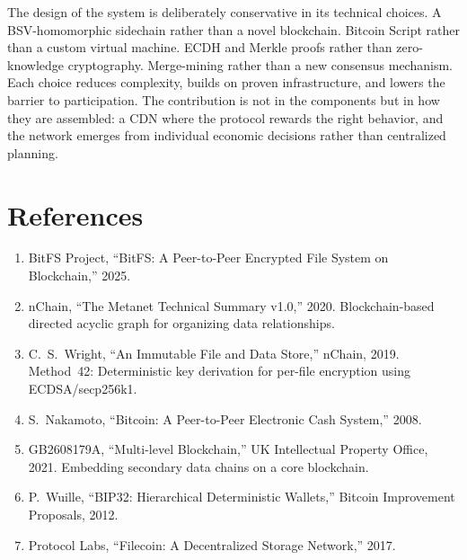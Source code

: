 \documentclass[11pt,a4paper]{article}
\begin{document}
The design of the system is deliberately conservative in its technical choices. A BSV-homomorphic sidechain rather than a novel blockchain. Bitcoin Script rather than a custom virtual machine. ECDH and Merkle proofs rather than zero-knowledge cryptography. Merge-mining rather than a new consensus mechanism. Each choice reduces complexity, builds on proven infrastructure, and lowers the barrier to participation. The contribution is not in the components but in how they are assembled: a CDN where the protocol rewards the right behavior, and the network emerges from individual economic decisions rather than centralized planning.

\section*{References}

\begin{enumerate}
\item BitFS Project, ``BitFS: A Peer-to-Peer Encrypted File System on Blockchain,'' 2025.

\item nChain, ``The Metanet Technical Summary v1.0,'' 2020. Blockchain-based directed acyclic graph for organizing data relationships.

\item C.~S.~Wright, ``An Immutable File and Data Store,'' nChain, 2019. Method~42: Deterministic key derivation for per-file encryption using ECDSA/secp256k1.

\item S.~Nakamoto, ``Bitcoin: A Peer-to-Peer Electronic Cash System,'' 2008.

\item GB2608179A, ``Multi-level Blockchain,'' UK Intellectual Property Office, 2021. Embedding secondary data chains on a core blockchain.

\item P.~Wuille, ``BIP32: Hierarchical Deterministic Wallets,'' Bitcoin Improvement Proposals, 2012.

\item Protocol Labs, ``Filecoin: A Decentralized Storage Network,'' 2017.
\end{enumerate}
\end{document}
